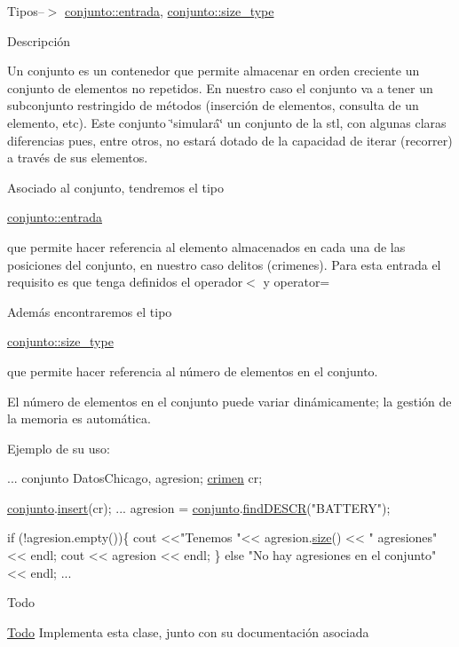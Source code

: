 Tipos--$>$ \hyperlink{classconjunto_a09cad766dd65de73e51eae21f9d22585}{conjunto\+::entrada}, \hyperlink{classconjunto_a855a5893bb0f5a851ab2dbf2b8aa6cc7}{conjunto\+::size\+\_\+type}

Descripción

Un conjunto es un contenedor que permite almacenar en orden creciente un conjunto de elementos no repetidos. En nuestro caso el conjunto va a tener un subconjunto restringido de métodos (inserción de elementos, consulta de un elemento, etc). Este conjunto \char`\"{}simulará\char`\"{} un conjunto de la stl, con algunas claras diferencias pues, entre otros, no estará dotado de la capacidad de iterar (recorrer) a través de sus elementos.

Asociado al conjunto, tendremos el tipo
\begin{DoxyCode}
\hyperlink{classcrimen}{conjunto::entrada} 
\end{DoxyCode}
 que permite hacer referencia al elemento almacenados en cada una de las posiciones del conjunto, en nuestro caso delitos (crimenes). Para esta entrada el requisito es que tenga definidos el operador$<$ y operator=

Además encontraremos el tipo
\begin{DoxyCode}
\hyperlink{classconjunto_a855a5893bb0f5a851ab2dbf2b8aa6cc7}{conjunto::size\_type} 
\end{DoxyCode}
 que permite hacer referencia al número de elementos en el conjunto.

El número de elementos en el conjunto puede variar dinámicamente; la gestión de la memoria es automática.

Ejemplo de su uso\+: 
\begin{DoxyCode}
...
conjunto DatosChicago, agresion;
\hyperlink{classcrimen}{crimen} cr;

\hyperlink{classconjunto}{conjunto}.\hyperlink{classconjunto_aa65b9f7c4cb9bad6d4e40c1973095930}{insert}(cr);
...
agresion = \hyperlink{classconjunto}{conjunto}.\hyperlink{classconjunto_afff3e7f4b3d00f422dd7ab2fec935378}{findDESCR}(\textcolor{stringliteral}{"BATTERY"});

\textcolor{keywordflow}{if} (!agresion.empty())\{
 cout <<\textcolor{stringliteral}{"Tenemos "}<< agresion.\hyperlink{classconjunto_a52ce2f5a076772be81f7d9bf0c22a558}{size}() << \textcolor{stringliteral}{" agresiones"} << endl;
 cout << agresion << endl;
\} \textcolor{keywordflow}{else} \textcolor{stringliteral}{"No hay agresiones en el conjunto"} << endl;
...
\end{DoxyCode}
 \begin{DoxyRefDesc}{Todo}
\item[\hyperlink{todo__todo000001}{Todo}]Implementa esta clase, junto con su documentación asociada \end{DoxyRefDesc}


